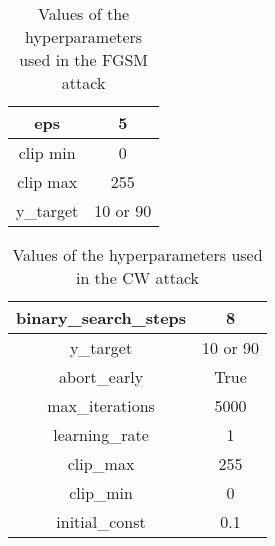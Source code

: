\begin{table}[]
\centering
\begin{tabular}{|c|c|}
\hline
eps & 5 \\  \hline
clip min & 0  \\ \hline
clip max & 255 \\ \hline
y\_target & 10 or 90 \\ \hline
\end{tabular}
\caption{Values of the hyperparameters used in the FGSM attack}
\label{table:fgsm-params}
\end{table}

\begin{table}[]
\centering
\begin{tabular}{|c|c|}
\hline
binary\_search\_steps & 8 \\ \hline
y\_target & 10 or 90 \\ \hline
abort\_early & True \\ \hline
max\_iterations & 5000 \\ \hline
learning\_rate & 1 \\ \hline
clip\_max & 255 \\ \hline
clip\_min & 0 \\ \hline
initial\_const & 0.1 \\ \hline
\end{tabular}
\caption{Values of the hyperparameters  used in the CW attack}
\label{table:cw-params}
\end{table}

